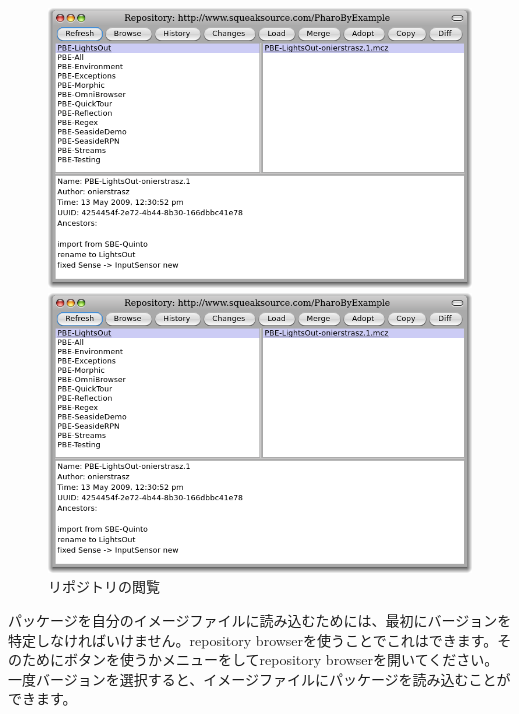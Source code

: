 \documentclass[a4paper,10pt,twoside]{book}
\begin{document}
\begin{figure}[hbt]
\ifluluelse
	{\centerline {\includegraphics[width=\textwidth]{BrowseRepository}}}
	{\centerline {\includegraphics[scale=0.7]{BrowseRepository}}}
\caption{リポジトリの閲覧
}
\end{figure}


パッケージを自分のイメージファイルに読み込むためには、最初にバージョンを特定しなければいけません。repository browserを使うことでこれはできます。そのためにボタンを使うかメニューを\actclick してrepository browserを開いてください。一度バージョンを選択すると、イメージファイルにパッケージを読み込むことができます。

\end{document}
